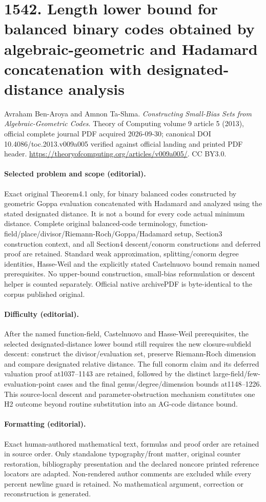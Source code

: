 \documentclass[10pt]{article}
\theoremstyle{definition}
\numberwithin{equation}{section}
\begin{document}
\section*{1542. Length lower bound for balanced binary codes obtained by algebraic-geometric and Hadamard concatenation with designated-distance analysis}
Avraham Ben-Aroya and Amnon Ta-Shma. \emph{Constructing Small-Bias Sets from Algebraic-Geometric Codes}. Theory of Computing volume 9 article 5 (2013), official complete journal PDF acquired 2026-09-30; canonical DOI 10.4086/toc.2013.v009a005 verified against official landing and printed PDF header. \url{https://theoryofcomputing.org/articles/v009a005/}. CC BY3.0.
\paragraph{Selected problem and scope (editorial).} Exact original Theorem4.1 only, for binary balanced codes constructed by geometric Goppa evaluation concatenated with Hadamard and analyzed using the stated designated distance. It is not a bound for every code actual minimum distance. Complete original balanced-code terminology, function-field/place/divisor/Riemann-Roch/Goppa/Hadamard setup, Section3 construction context, and all Section4 descent/conorm constructions and deferred proof are retained. Standard weak approximation, splitting/conorm degree identities, Hasse-Weil and the explicitly stated Castelnuovo bound remain named prerequisites. No upper-bound construction, small-bias reformulation or descent helper is counted separately. Official native archivePDF is byte-identical to the corpus published original.
\paragraph{Difficulty (editorial).} After the named function-field, Castelnuovo and Hasse-Weil prerequisites, the selected designated-distance lower bound still requires the new closure-subfield descent: construct the divisor/evaluation set, preserve Riemann-Roch dimension and compare designated relative distance. The full conorm claim and its deferred valuation proof at1037–1143 are retained, followed by the distinct large-field/few-evaluation-point cases and the final genus/degree/dimension bounds at1148–1226. This source-local descent and parameter-obstruction mechanism constitutes one H2 outcome beyond routine substitution into an AG-code distance bound.
\paragraph{Formatting (editorial).} Exact human-authored mathematical text, formulas and proof order are retained in source order. Only standalone typography/front matter, original counter restoration, bibliography presentation and the declared noncore printed reference locators are adapted. Non-rendered author comments are excluded while every percent newline guard is retained. No mathematical argument, correction or reconstruction is generated.
\end{document}
